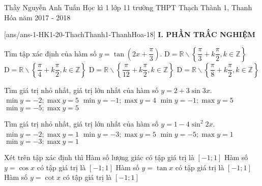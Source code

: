 	\begin{name}
		{Thầy Nguyễn Anh Tuấn}
		{Học kì 1 lớp 11 trường THPT Thạch Thành 1, Thanh Hóa năm  2017 - 2018}
	\end{name}
	\setcounter{ex}{0}\setcounter{bt}{0}
	[ans/ans-1-HK1-20-ThachThanh1-ThanhHoa-18]
\noindent\textbf{I. PHẦN TRẮC NGHIỆM}
\begin{ex}%
	Tìm tập xác định của hàm số $y=\tan \left(2x+\dfrac{\pi}{3}\right)$.
	\choice
	{$\mathrm D=\mathbb{R}\backslash \left\{\dfrac{\pi}{3}+k\dfrac{\pi}{2},k\in \mathbb{Z}\right\}$}
	{$\mathrm D=\mathbb{R}\backslash \left\{\dfrac{\pi}{4}+k\dfrac{\pi}{2},k\in \mathbb{Z}\right\}$}
	{\True $\mathrm D=\mathbb{R}\backslash \left\{\dfrac{\pi}{12}+k\dfrac{\pi}{2},k\in \mathbb{Z}\right\}$}
	{$\mathrm D=\mathbb{R}\backslash \left\{\dfrac{\pi}{8}+k\dfrac{\pi}{2},k\in \mathbb{Z}\right\}$}
\end{ex}
\begin{ex}%
	Tìm giá trị nhỏ nhất, giá trị lớn nhất của hàm số $y=2+3\sin 3x$.
	\choice
	{$\min y=-2;\max y=5$}
	{$\min y=-1;\max y=4$}
	{\True $\min y=-1;\max y=5$}
	{$\min y=-5;\max y=5$}
\end{ex}
\begin{ex}%
	Tìm giá trị nhỏ nhất, giá trị lớn nhất của hàm số $y=1-4  \sin^2 2x$.
	\choice
	{$\min y=-2;\max y=1$}
	{$\min y=-3;\max y=5$}
	{$\min y=-5;\max y=1$}
	{\True $\min y=-3;\max y=1$}
\end{ex}
\begin{ex}%
	Xét trên tập xác định thì
	\choice
	{Hàm số lượng giác có tập giá trị là $\left[-1;1\right]$}
	{\True Hàm số $y=\cos x$ có tập giá trị là $\left[-1;1\right]$}
	{Hàm số $y=\tan x$ có tập giá trị là $\left[-1;1\right]$}
	{Hàm số $y=\cot x$ có tập giá trị là $\left[-1;1\right]$}
\end{ex}
